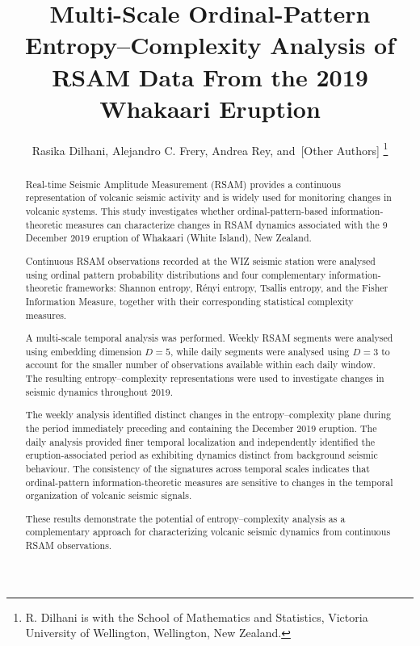 \documentclass[journal]{IEEEtran}
\title{
	Multi-Scale Ordinal-Pattern Entropy--Complexity Analysis 
	of RSAM Data From the 2019 Whakaari Eruption
}
\author{
	Rasika Dilhani,
	Alejandro C. Frery,
	Andrea Rey,
	and~[Other Authors]
	\thanks{
		R. Dilhani is with the School of Mathematics and Statistics,
		Victoria University of Wellington, Wellington, New Zealand.
	}
}
\begin{document}
	
	\maketitle
	
	
	\begin{abstract}
		
		Real-time Seismic Amplitude Measurement (RSAM) provides a
		continuous representation of volcanic seismic activity and is
		widely used for monitoring changes in volcanic systems.
		This study investigates whether ordinal-pattern-based
		information-theoretic measures can characterize changes in RSAM
		dynamics associated with the 9 December 2019 eruption of Whakaari
		(White Island), New Zealand.
		
		Continuous RSAM observations recorded at the WIZ seismic station
		were analysed using ordinal pattern probability distributions and
		four complementary information-theoretic frameworks: Shannon
		entropy, R\'enyi entropy, Tsallis entropy, and the Fisher
		Information Measure, together with their corresponding statistical
		complexity measures.
		
		A multi-scale temporal analysis was performed. Weekly RSAM
		segments were analysed using embedding dimension $D=5$, while
		daily segments were analysed using $D=3$ to account for the
		smaller number of observations available within each daily
		window. The resulting entropy--complexity representations were
		used to investigate changes in seismic dynamics throughout 2019.
		
		The weekly analysis identified distinct changes in the
		entropy--complexity plane during the period immediately preceding
		and containing the December 2019 eruption. The daily analysis
		provided finer temporal localization and independently identified
		the eruption-associated period as exhibiting dynamics distinct
		from background seismic behaviour. The consistency of the
		signatures across temporal scales indicates that ordinal-pattern
		information-theoretic measures are sensitive to changes in the
		temporal organization of volcanic seismic signals.
		
		These results demonstrate the potential of entropy--complexity
		analysis as a complementary approach for characterizing volcanic
		seismic dynamics from continuous RSAM observations.
		
	\end{abstract}
	
\end{document}
